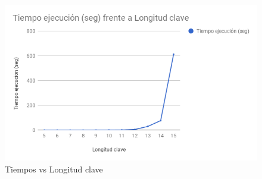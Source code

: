 \begin{figure}[H]
	\includegraphics[width=1\linewidth]{chart}
	\caption{Tiempos vs Longitud clave}
\end{figure}









